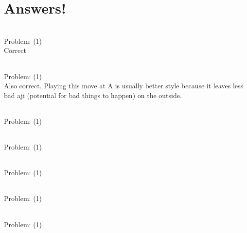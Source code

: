 \documentclass[11pt]{article}
\begin{document}
\part{Answers!}
\begin{minipage}[t]{0.5\textwidth}
  {\centering
  
\\
Problem: (1)\\
Correct\\
  }
\end{minipage}
\begin{minipage}[t]{0.5\textwidth}
  {\centering
  
\\
Problem: (1)\\
Also correct. Playing this move at A is usually better style because it leaves less bad aji (potential for bad things to happen) on the outside.\\
  }
\end{minipage}
\begin{minipage}[t]{0.5\textwidth}
  {\centering
  
\\
Problem: (1)\\
  }
\end{minipage}
\begin{minipage}[t]{0.5\textwidth}
  {\centering
  
\\
Problem: (1)\\
  }
\end{minipage}
\begin{minipage}[t]{0.5\textwidth}
  {\centering
  
\\
Problem: (1)\\
  }
\end{minipage}
\begin{minipage}[t]{0.5\textwidth}
  {\centering
  
\\
Problem: (1)\\
  }
\end{minipage}
\begin{minipage}[t]{0.5\textwidth}
  {\centering
  
\\
Problem: (1)\\
  }
\end{minipage}
\end{document}
